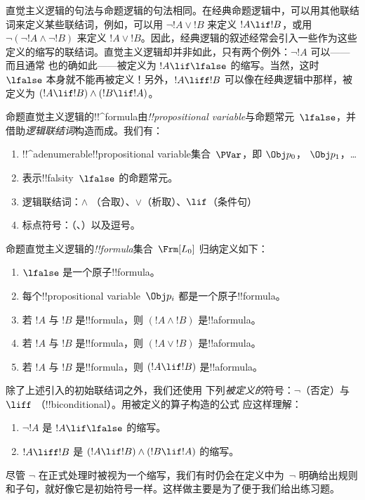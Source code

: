 \documentclass[../../../include/open-logic-section]{subfiles}
\begin{document}


直觉主义逻辑的句法与命题逻辑的句法相同。在经典命题逻辑中，可以用其他联结词来定义某些联结词，例如，可以用
$\lnot !A \lor !B$ 来定义 $!A \lif !B$，或用 $\lnot(\lnot !A \land \lnot
!B)$ 来定义 $!A \lor !B$。因此，经典逻辑的叙述经常会引入一些作为这些定义的缩写的联结词。直觉主义逻辑却并非如此，只有两个例外：$\lnot !A$ 可以——而且通常
也的确如此——被定义为 $!A \lif \lfalse$ 的缩写。当然，这时 $\lfalse$ 本身就不能再被定义！{}另外，$!A \liff !B$
可以像在经典逻辑中那样，被定义为 $(!A \lif !B) \land (!B \lif
!A)$。

命题直觉主义逻辑的!!^{formula}由\emph{!!{propositional variable}}与命题常元~$\lfalse$，并借助\emph{逻辑联结词}构造而成。我们有：

\begin{enumerate}
\item !!^a{denumerable}!!{propositional variable}集合~$\PVar$，即 $\Obj p_0$，
  $\Obj p_1$，\dots
  \item 表示!!{falsity}~$\lfalse$ 的命题常元。
\item 逻辑联结词：$\land$
  （合取）、$\lor$（析取）、$\lif$（条件句）
\item 标点符号：（、）以及逗号。
\end{enumerate}

\begin{defn}[公式]
 命题直觉主义逻辑的\emph{!!{formula}}集合~$\Frm[L_0]$ 归纳定义如下：
\begin{enumerate}
\item $\lfalse$ 是一个原子!!{formula}。

\item 每个!!{propositional variable}~$\Obj p_i$ 都是一个原子!!{formula}。

\item 若 $!A$ 与 $!B$ 是!!{formula}，则 $(!A \land
  !B)$ 是!!a{formula}。

\item 若 $!A$ 与 $!B$ 是!!{formula}，则 $(!A \lor !B)$
  是!!a{formula}。

\item 若 $!A$ 与 $!B$ 是!!{formula}，则 $(!A \lif !B)$
  是!!a{formula}。

\end{enumerate}
\end{defn}

除了上述引入的初始联结词之外，我们还使用
下列\emph{被定义的}符号：$\lnot$（否定）与 $\liff$
（!!{biconditional}）。用被定义的算子构造的公式
应这样理解：
\begin{enumerate}
\item $\lnot !A$ 是 $!A \lif \lfalse$ 的缩写。

\item $!A \liff !B$ 是 $(!A \lif !B) \land (!B
  \lif !A)$ 的缩写。
\end{enumerate}

尽管 $\lnot$ 在正式处理时被视为一个缩写，我们有时仍会在定义中为~$\lnot$ 明确给出规则和子句，就好像它是初始符号一样。这样做主要是为了便于我们给出练习题。
\end{document}
